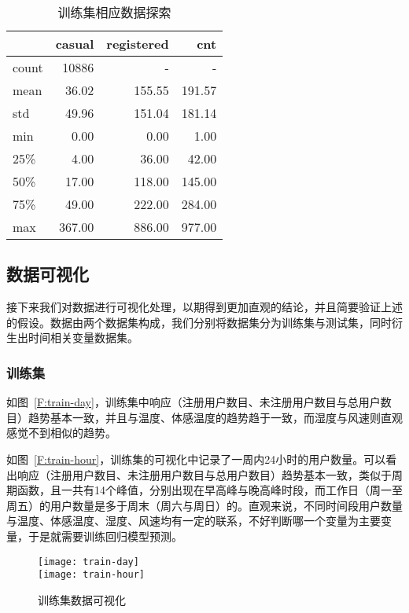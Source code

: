 \begin{table}[htbp]
    \centering\tiny
    \begin{tabular}{lrrr}
    \toprule
    {}    & casual & registered & cnt \\
    \midrule
    count &  10886 &    -   &    -    \\
    mean  &  36.02 & 155.55 & 191.57  \\
    std   &  49.96 & 151.04 & 181.14  \\
    min   &   0.00 &   0.00 &   1.00  \\
    25\%  &   4.00 &  36.00 &  42.00  \\
    50\%  &  17.00 & 118.00 & 145.00  \\
    75\%  &  49.00 & 222.00 & 284.00  \\
    max   & 367.00 & 886.00 & 977.00  \\
    \bottomrule
    \end{tabular}
    \cprotect\caption{训练集相应数据探索}\label{T:train-hour_y-data}
\end{table}


\subsection{数据可视化}
接下来我们对数据进行可视化处理，以期得到更加直观的结论，并且简要验证上述的假设。数据由两个数据集构成，我们分别将数据集分为训练集与测试集，同时衍生出时间相关变量数据集。

\subsubsection{训练集}
如图~\ref{F:train-day}，训练集中响应（注册用户数目、未注册用户数目与总用户数目）趋势基本一致，并且与温度、体感温度的趋势趋于一致，而湿度与风速则直观感觉不到相似的趋势。

如图~\ref{F:train-hour}，训练集的可视化中记录了一周内24小时的用户数量。可以看出响应（注册用户数目、未注册用户数目与总用户数目）趋势基本一致，类似于周期函数，且一共有14个峰值，分别出现在早高峰与晚高峰时段，而工作日（周一至周五）的用户数量是多于周末（周六与周日）的。直观来说，不同时间段用户数量与温度、体感温度、湿度、风速均有一定的联系，不好判断哪一个变量为主要变量，于是就需要训练回归模型预测。
\begin{figure}[htbp]
    \centering
    \cprotect{}
        {\texttt{[image: train-day]}} \\
    \cprotect{}
        {\texttt{[image: train-hour]}}
    \caption{训练集数据可视化}\label{F:train}
\end{figure}

